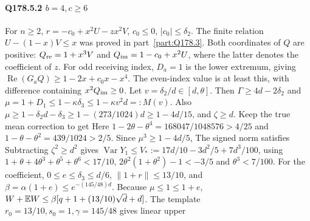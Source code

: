 \paragraph{Q178.5.2 $b=\allowbreak 4,\allowbreak c\ge\allowbreak 6$}
For $n\ge\allowbreak 2$,
$r=\allowbreak -c_0+x^2U-zx^2V$, $c_0\le\allowbreak 0$, $|c_0|\le\allowbreak \delta_2$.
The finite relation $U-(1-x)V\le\allowbreak  x$ was proved in part~\ref{part:Q178.3}.
Both coordinates of $Q$ are positive:
$Q_{\rm re}=\allowbreak 1+x^3V$ and $Q_{\rm im}=\allowbreak 1-c_0+x^2U$,
where the latter denotes the coefficient of $z$.
For odd receiving index, $D_a=\allowbreak 1$ is the lower extremum, giving
$\operatorname{Re}(G_aQ)\ge\allowbreak 1-2x+c_0x-x^4$.
The even-index value is at least this, with difference containing
$x^2Q_{\rm im}\ge\allowbreak 0$.
Let $v=\allowbreak \delta_2/d\in[d,\allowbreak \theta]$. Then
$\Gamma\ge\allowbreak 4d-2\delta_2$ and
$\mu=\allowbreak 1+D_1\le\allowbreak 1-\kappa\delta_3\le\allowbreak 1-\kappa v^2d=\allowbreak :M(v)$.
Also $\mu\ge\allowbreak 1-\delta_2d-\delta_3\ge\allowbreak 1-(273/1024)d\ge\allowbreak 1-4d/15$,
and $\zeta\ge\allowbreak  d$.
Keep the true mean correction to get
Here $1-2\theta-\theta^4=\allowbreak 168047/1048576>\allowbreak 4/25$ and
$1-\theta-\theta^2=\allowbreak 439/1024>\allowbreak 2/5$.
Since $\mu^3\ge\allowbreak 1-4d/5$,
The signed norm satisfies
Subtracting $\zeta^2\ge\allowbreak  d^2$ gives
$\operatorname{Var}Y_1\le\allowbreak  V_*:=\allowbreak 17d/10-3d^2/5+7d^3/100$,
using $1+\theta+4\theta^3+\theta^5+\theta^6<\allowbreak 17/10$,
$2\theta^2(1+\theta^2)-1<\allowbreak -3/5$ and $\theta^3<\allowbreak 7/100$.
For the coefficient, $0\le\allowbreak  e\le\allowbreak \delta_3\le\allowbreak  d/6$,
$\|1+r\|\le\allowbreak 13/10$, and
$\beta=\allowbreak \alpha(1+e)\le\allowbreak  e^{-(145/48)d}$.
Because $\mu\le\allowbreak 1\le\allowbreak 1+e$,
$W+\mathbb E W\le\allowbreak \beta[q+1+(13/10)\sqrt d+d]$.
The template $r_0=\allowbreak 13/10,\allowbreak s_0=\allowbreak 1,\allowbreak \gamma=\allowbreak 145/48$ gives linear upper
